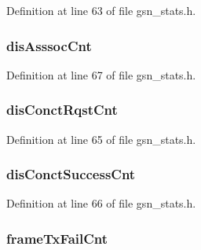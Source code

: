 Definition at line 63 of file gsn\_\-stats.h.

\hypertarget{a00301_a8547634d0532fee8cdb7e2bc3390e335}{
\subsubsection[{disAsssocCnt}]{ {\bf disAsssocCnt}}}
\label{a00301_a8547634d0532fee8cdb7e2bc3390e335}


Definition at line 67 of file gsn\_\-stats.h.

\hypertarget{a00301_a85a32f1234768ac2dff45471f1c6ce21}{
\subsubsection[{disConctRqstCnt}]{ {\bf disConctRqstCnt}}}
\label{a00301_a85a32f1234768ac2dff45471f1c6ce21}


Definition at line 65 of file gsn\_\-stats.h.

\hypertarget{a00301_a8d35eccf66881d1e2462f6e7d6170ed5}{
\subsubsection[{disConctSuccessCnt}]{ {\bf disConctSuccessCnt}}}
\label{a00301_a8d35eccf66881d1e2462f6e7d6170ed5}


Definition at line 66 of file gsn\_\-stats.h.

\hypertarget{a00301_a986d5aa380acb3f636e724d3711b71a8}{
\subsubsection[{frameTxFailCnt}]{ {\bf frameTxFailCnt}}}
\label{a00301_a986d5aa380acb3f636e724d3711b71a8}


